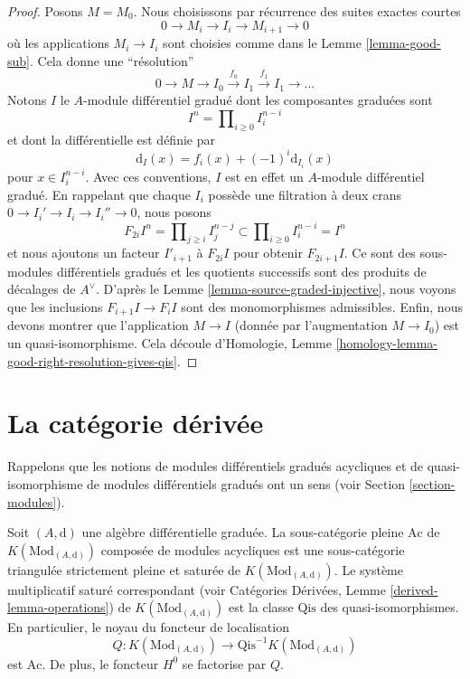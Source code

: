\begin{proof}
Posons $M = M_0$. Nous choisissons par récurrence des suites exactes courtes
$$
0 \to M_i \to I_i \to M_{i + 1} \to 0
$$
où les applications $M_i \to I_i$ sont choisies comme dans le Lemme
\ref{lemma-good-sub}. Cela donne une ``résolution''
$$
0 \to M \to I_0 \xrightarrow{f_0} I_1 \xrightarrow{f_1} I_1 \to \ldots
$$
Notons $I$ le $A$-module différentiel gradué dont les composantes graduées sont
$$
I^n = \prod\nolimits_{i \geq 0} I^{n - i}_i
$$
et dont la différentielle est définie par
$$
\text{d}_I(x) = f_i(x) + (-1)^i \text{d}_{I_i}(x)
$$
pour $x \in I_i^{n - i}$. Avec ces conventions, $I$ est en effet un $A$-module
différentiel gradué. En rappelant que chaque $I_i$ possède une filtration à deux
crans $0 \to I_i' \to I_i \to I_i'' \to 0$, nous posons
$$
F_{2i}I^n = \prod\nolimits_{j \geq i} I^{n - j}_j
\subset
\prod\nolimits_{i \geq 0} I^{n - i}_i = I^n
$$
et nous ajoutons un facteur $I'_{i + 1}$ à $F_{2i}I$ pour obtenir $F_{2i + 1}I$.
Ce sont des sous-modules différentiels gradués et les quotients successifs sont
des produits de décalages de $A^\vee$. D'après le Lemme
\ref{lemma-source-graded-injective}, nous voyons que les inclusions $F_{i + 1}I
\to F_iI$ sont des monomorphismes admissibles. Enfin, nous devons montrer que
l'application $M \to I$ (donnée par l'augmentation $M \to I_0$) est un
quasi-isomorphisme. Cela découle d'Homologie, Lemme
\ref{homology-lemma-good-right-resolution-gives-qis}.
\end{proof}






\section{La catégorie dérivée}
\label{section-derived}

\noindent
Rappelons que les notions de modules différentiels gradués acycliques et de
quasi-isomorphisme de modules différentiels gradués ont un sens (voir Section
\ref{section-modules}).

\begin{lemma}
\label{lemma-acyclic}
Soit $(A, \text{d})$ une algèbre différentielle graduée. La sous-catégorie pleine
$\text{Ac}$ de $K(\text{Mod}_{(A, \text{d})})$ composée de modules acycliques est
une sous-catégorie triangulée strictement pleine et saturée de $K(\text{Mod}_{(A,
\text{d})})$. Le système multiplicatif saturé correspondant (voir Catégories
Dérivées, Lemme \ref{derived-lemma-operations}) de $K(\text{Mod}_{(A, \text{d})})$
est la classe $\text{Qis}$ des quasi-isomorphismes. En particulier, le noyau du
foncteur de localisation
$$
Q : K(\text{Mod}_{(A, \text{d})}) \to
\text{Qis}^{-1}K(\text{Mod}_{(A, \text{d})})
$$
est $\text{Ac}$. De plus, le foncteur $H^0$ se factorise par $Q$.
\end{lemma}

